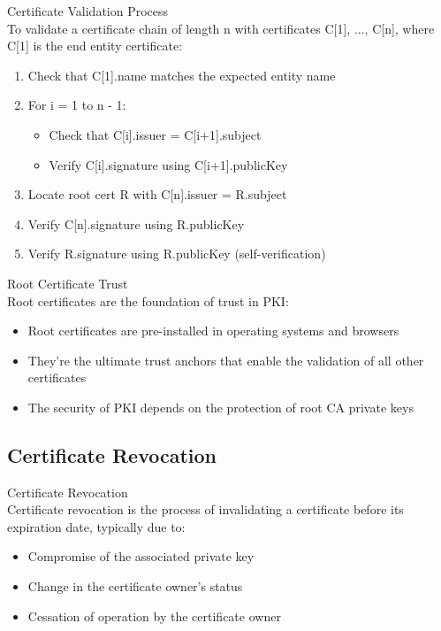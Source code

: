 \begin{lemma}{Certificate Validation Process}\\
To validate a certificate chain of length n with certificates C[1], ..., C[n], where C[1] is the end entity certificate:
\begin{enumerate}
    \item Check that C[1].name matches the expected entity name
    \item For i = 1 to n - 1:
    \begin{itemize}
        \item Check that C[i].issuer = C[i+1].subject
        \item Verify C[i].signature using C[i+1].publicKey
    \end{itemize}
    \item Locate root cert R with C[n].issuer = R.subject
    \item Verify C[n].signature using R.publicKey
    \item Verify R.signature using R.publicKey (self-verification)
\end{enumerate}
\end{lemma}

\begin{theorem}{Root Certificate Trust}\\
Root certificates are the foundation of trust in PKI:
\begin{itemize}
    \item Root certificates are pre-installed in operating systems and browsers
    \item They're the ultimate trust anchors that enable the validation of all other certificates
    \item The security of PKI depends on the protection of root CA private keys
\end{itemize}
\end{theorem}

\subsection{Certificate Revocation}

\begin{definition}{Certificate Revocation}\\
Certificate revocation is the process of invalidating a certificate before its expiration date, typically due to:
\begin{itemize}
    \item Compromise of the associated private key
    \item Change in the certificate owner's status
    \item Cessation of operation by the certificate owner
\end{itemize}
\end{definition}

